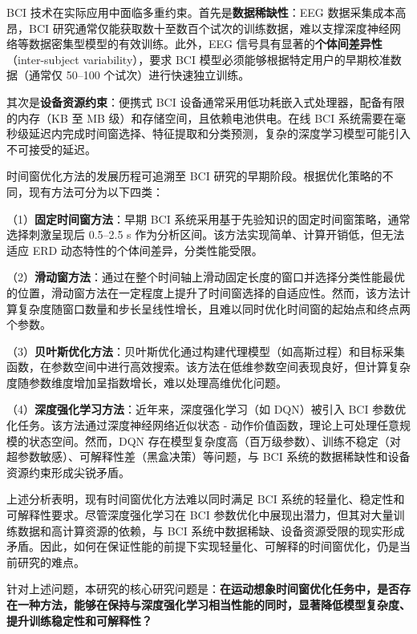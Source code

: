 \label{sec:problem_statement}

BCI 技术在实际应用中面临多重约束。首先是\textbf{数据稀缺性}：EEG 数据采集成本高昂，BCI 研究通常仅能获取数十至数百个试次的训练数据，难以支撑深度神经网络等数据密集型模型的有效训练\cite{lotte2007review}。此外，EEG 信号具有显著的\textbf{个体间差异性}（inter-subject variability），要求 BCI 模型必须能够根据特定用户的早期校准数据（通常仅 50--100 个试次）进行快速独立训练\cite{lotte2011regularizing}。

其次是\textbf{设备资源约束}：便携式 BCI 设备通常采用低功耗嵌入式处理器，配备有限的内存（KB 至 MB 级）和存储空间，且依赖电池供电。在线 BCI 系统需要在毫秒级延迟内完成时间窗选择、特征提取和分类预测，复杂的深度学习模型可能引入不可接受的延迟。

时间窗优化方法的发展历程可追溯至 BCI 研究的早期阶段。根据优化策略的不同，现有方法可分为以下四类：

（1）\textbf{固定时间窗方法}：早期 BCI 系统采用基于先验知识的固定时间窗策略，通常选择刺激呈现后 0.5--2.5 s 作为分析区间\cite{mcfarland1997spatial}。该方法实现简单、计算开销低，但无法适应 ERD 动态特性的个体间差异，分类性能受限\cite{zhang2019temporally}。

（2）\textbf{滑动窗方法}：通过在整个时间轴上滑动固定长度的窗口并选择分类性能最优的位置，滑动窗方法在一定程度上提升了时间窗选择的自适应性\cite{yang2015time}。然而，该方法计算复杂度随窗口数量和步长呈线性增长，且难以同时优化时间窗的起始点和终点两个参数。

（3）\textbf{贝叶斯优化方法}：贝叶斯优化通过构建代理模型（如高斯过程）和目标采集函数，在参数空间中进行高效搜索\cite{yang2015time}。该方法在低维参数空间表现良好，但计算复杂度随参数维度增加呈指数增长，难以处理高维优化问题。

（4）\textbf{深度强化学习方法}：近年来，深度强化学习（如 DQN）被引入 BCI 参数优化任务\cite{chen2019dynamic, zhang2021mars}。该方法通过深度神经网络近似状态 - 动作价值函数，理论上可处理任意规模的状态空间。然而，DQN 存在模型复杂度高（百万级参数）、训练不稳定（对超参数敏感）、可解释性差（黑盒决策）等问题\cite{mnih2015human}，与 BCI 系统的数据稀缺性和设备资源约束形成尖锐矛盾。

上述分析表明，现有时间窗优化方法难以同时满足 BCI 系统的轻量化、稳定性和可解释性要求。尽管深度强化学习在 BCI 参数优化中展现出潜力，但其对大量训练数据和高计算资源的依赖，与 BCI 系统中数据稀缺、设备资源受限的现实形成矛盾。因此，如何在保证性能的前提下实现轻量化、可解释的时间窗优化，仍是当前研究的难点。

针对上述问题，本研究的核心研究问题是：\textbf{在运动想象时间窗优化任务中，是否存在一种方法，能够在保持与深度强化学习相当性能的同时，显著降低模型复杂度、提升训练稳定性和可解释性？}

